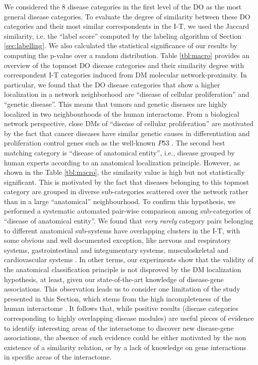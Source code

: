 \documentclass[journal,twoside,web]{ieeecolor}
\begin{document}
We considered the 8 disease categories in the first level of the DO as the most general disease categories. 
To evaluate the degree of similarity between these DO categories and their most similar correspondents in the  I-T, we used the Jaccard similarity, i.e. the ``label score'' computed by the labeling algorithm of Section \ref{sec:labelling}. We also calculated the statistical significance of our results by computing the p-value over a random distribution. 
Table \ref{tbl:macro} provides an overview of the topmost DO  disease categories and their similarity degree with correspondent I-T categories induced from DM molecular network-proximity. In particular, we found that the DO disease categories that show a higher localization in a network neighborhood are ``disease of cellular proliferation'' and ``genetic disease''. This  means that tumors and genetic diseases are highly localized in two neighbourhoods of the human interactome. From a biological network perspective,  close DMs of ``disease of cellular proliferation''  are motivated by the fact that cancer diseases have similar genetic causes in differentiation and proliferation control genes such as the well-known $P53$ \cite{goh2007human, wood2007genomic,networkmedicine}. 
The second best matching category is  ``disease of anatomical entity'', i.e., disease grouped by human experts according to an anatomical  localization principle.  However, as shown in the Table \ref{tbl:macro}, the similarity value is high but not statistically significant. This is motivated by the fact that  diseases belonging to this topmost category are grouped in diverse sub-categories scattered over the network rather than in a large ``anatomical'' neighbourhood. 
To confirm this hypothesis, we performed a systematic automated pair-wise comparison among sub-categories of ``disease of anatomical entity''. We found that \textit{very rarely} category pairs belonging to different anatomical sub-systems  have overlapping clusters in the I-T, with some obvious and well documented exception, like nervous and respiratory systems, gastrointestinal and integumentary systems, musculoskeletal and cardiovascular systems \cite{chhabra2005cardiovascular, huang2012skin, maron2013hypertrophic}.  In other terms, our experiments show that the  validity of the anatomical classification principle is not  disproved by the DM localization hypothesis, at least,  given our state-of-the-art knowledge of disease-gene associations. This observation leads us to consider one limitation of the study presented in this Section, which stems from the high incompleteness of the human interactome \cite{Venkatesan}. It follows that, while positive results (disease categories corresponding to highly overlapping disease modules) are useful pieces of evidence to identify interesting areas of the interactome to discover new disease-gene associations, the absence of such evidence could be either motivated by the non existence of a similarity relation, or by a lack of knowledge on gene interactions in specific areas of the interactome.\\
\end{document}
